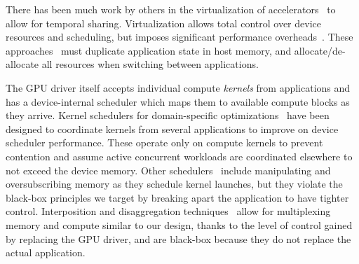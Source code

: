 
There has been much work by others in the virtualization of accelerators~\cite{duato2010rcuda, yu2019automatic, hong2017gpu} to allow for temporal sharing.
Virtualization allows total control over device resources and scheduling, but imposes significant performance overheads~\cite{yu2017full}.
These approaches~\cite{yu2019automatic, hong2017gpu} must duplicate application state in host memory, and allocate/de-allocate all resources when switching between applications.


The GPU driver itself accepts individual compute \emph{kernels} from applications and has a device-internal scheduler which maps them to available compute blocks as they arrive.
Kernel schedulers for domain-specific optimizations~\cite{strati2024orion,chen2017effisha,kim2020navigator,gu2023fast} have been designed to coordinate kernels from several applications to improve on device scheduler performance.
These operate only on compute kernels to prevent contention and assume active concurrent workloads are coordinated elsewhere to not exceed the device memory.
Other schedulers~\cite{ng2023paella,pemberton2022kernel,strati2024orion} include manipulating and oversubscribing memory as they schedule kernel launches, but they violate the black-box principles we target by breaking apart the application to have tighter control.
Interposition and disaggregation techniques~\cite{fingler2022dgsf,duato2010rcuda} allow for multiplexing memory and compute similar to our design, thanks to the level of control gained by replacing the GPU driver, and are black-box because they do not replace the actual application.


